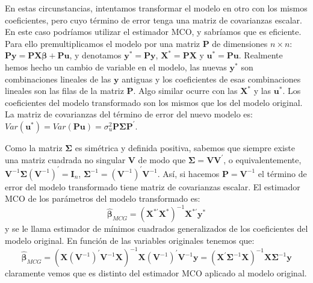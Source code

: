 En estas circunstancias, intentamos transformar el modelo en otro
con los mismos coeficientes, pero cuyo t\'ermino de error tenga una
matriz de covarianzas escalar. En este caso podr\'iamos utilizar el
estimador MCO, y sabr\'iamos que es eficiente. Para ello premultiplicamos
el modelo por una matriz $\boldsymbol{P}$ de dimensiones $n\times n$:
$\boldsymbol{P}\boldsymbol{y}=\boldsymbol{P}\boldsymbol{X}\boldsymbol{\beta}+\boldsymbol{P}\boldsymbol{u}$,
y denotamos $\boldsymbol{y}^{*}=\boldsymbol{P}\boldsymbol{y}$, $\boldsymbol{X}^{*}=\boldsymbol{P}\boldsymbol{X}$
y $\boldsymbol{u}^{*}=\boldsymbol{P}\boldsymbol{u}$. Realmente hemos
hecho un cambio de variable en el modelo, las nuevas $\boldsymbol{y}^{*}$
son combinaciones lineales de las $\boldsymbol{y}$ antiguas y los
coeficientes de esas combinaciones lineales son las filas de la matriz
$\boldsymbol{P}$. Algo similar ocurre con las $\boldsymbol{X}^{*}$
y las $\boldsymbol{u}^{*}$. Los coeficientes del modelo transformado
son los mismos que los del modelo original. La matriz de covarianzas
del t\'ermino de error del nuevo modelo es: $Var\left(\boldsymbol{u}^{*}\right)=Var\left(\boldsymbol{P}\boldsymbol{u}\right)=\sigma_{u}^{2}\boldsymbol{P}\boldsymbol{\Sigma}\boldsymbol{P}^{\prime}$.

Como la matriz $\boldsymbol{\Sigma}$ es sim\'etrica y definida positiva,
sabemos que siempre existe una matriz cuadrada no singular $\boldsymbol{V}$
de modo que $\boldsymbol{\Sigma}=\boldsymbol{V}\boldsymbol{V}^{\prime}$,
o equivalentemente, $\boldsymbol{V}^{-1}\boldsymbol{\Sigma}\left(\boldsymbol{V}^{-1}\right)^{\prime}=\boldsymbol{I}_{n}$,
$\boldsymbol{\Sigma}^{-1}=\left(\boldsymbol{V}^{-1}\right)^{\prime}\boldsymbol{V}^{-1}$.
As\'i, si hacemos $\boldsymbol{P}=\boldsymbol{V}^{-1}$ el t\'ermino de
error del modelo transformado tiene matriz de covarianzas escalar.
El estimador MCO de los par\'ametros del modelo transformado es: 
\[
\hat{\boldsymbol{\beta}}_{MCG}=\left(\boldsymbol{X}^{*\prime}\boldsymbol{X}^{*}\right)^{-1}\boldsymbol{X}^{*\prime}\boldsymbol{y}^{*}
\]
 y se le llama estimador de m\'inimos cuadrados generalizados de los
coeficientes del modelo original. En funci\'on de las variables originales
tenemos que:
\[
\hat{\boldsymbol{\beta}}_{MCG}=\left(\boldsymbol{X}\left(\boldsymbol{V}^{-1}\right)^{\prime}\boldsymbol{V}^{-1}\boldsymbol{X}\right)^{-1}\boldsymbol{X}\left(\boldsymbol{V}^{-1}\right)^{\prime}\boldsymbol{V}^{-1}\boldsymbol{y}=\left(\boldsymbol{X}^{\prime}\boldsymbol{\Sigma}^{-1}\boldsymbol{X}\right)^{-1}\boldsymbol{X}\boldsymbol{\Sigma}^{-1}\boldsymbol{y}
\]
 claramente vemos que es distinto del estimador MCO aplicado al modelo
original.


